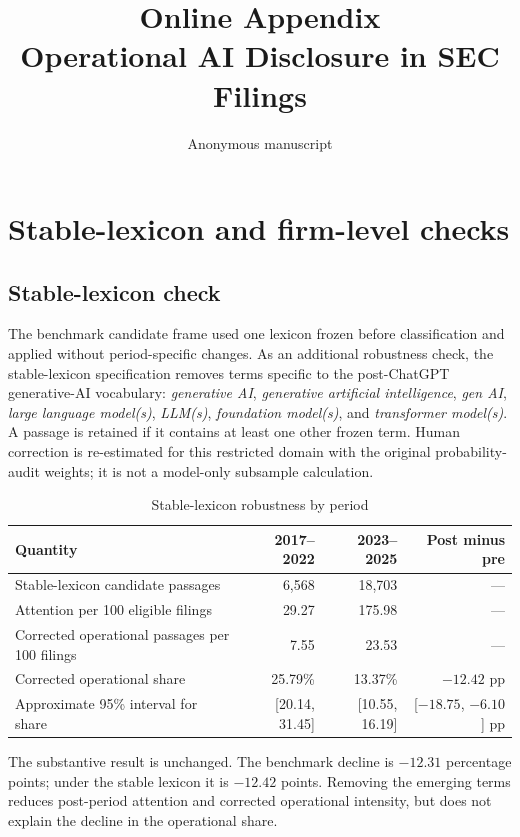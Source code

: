 \documentclass[11pt]{article}
\title{Online Appendix\\Operational AI Disclosure in SEC Filings}
\author{Anonymous manuscript}
\date{}
\begin{document}
\maketitle
\tableofcontents

\section{Stable-lexicon and firm-level checks}

\subsection{Stable-lexicon check}

The benchmark candidate frame used one lexicon frozen before classification
and applied without period-specific changes. As an additional robustness
check, the stable-lexicon specification removes terms specific to the
post-ChatGPT generative-AI vocabulary: \textit{generative AI},
\textit{generative artificial intelligence}, \textit{gen AI}, \textit{large
language model(s)}, \textit{LLM(s)}, \textit{foundation model(s)}, and
\textit{transformer model(s)}. A passage is retained if it contains at least
one other frozen term. Human correction is re-estimated for this restricted
domain with the original probability-audit weights; it is not a model-only
subsample calculation.

\begin{table}[htbp]
\centering
\caption{Stable-lexicon robustness by period}
\small
\begin{tabularx}{\textwidth}{@{}Xrrr@{}}
\toprule
Quantity & 2017--2022 & 2023--2025 & Post minus pre \\
\midrule
Stable-lexicon candidate passages & 6,568 & 18,703 & --- \\
Attention per 100 eligible filings & 29.27 & 175.98 & --- \\
Corrected operational passages per 100 filings
  & 7.55 & 23.53 & --- \\
Corrected operational share
  & 25.79\% & 13.37\% & $-12.42$ pp \\
Approximate 95\% interval for share & [20.14, 31.45] &
  [10.55, 16.19] & [$-18.75$, $-6.10$] pp \\
\bottomrule
\end{tabularx}
\end{table}

The substantive result is unchanged. The benchmark decline is $-12.31$
percentage points; under the stable lexicon it is $-12.42$ points. Removing
the emerging terms reduces post-period attention and corrected operational
intensity, but does not explain the decline in the operational share.
\end{document}
